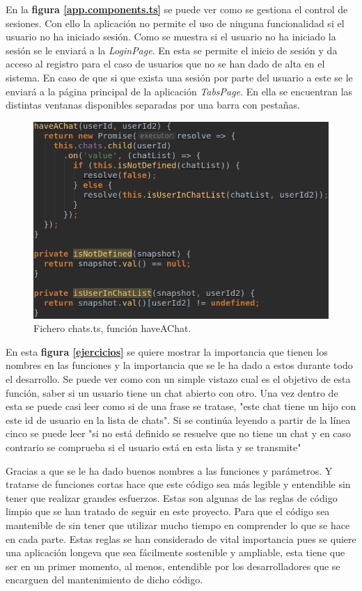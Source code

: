 \medskip
En la \textbf{figura \ref{app.components.ts}} se puede ver como se gestiona
el control de sesiones. Con ello la aplicación no permite el uso de ninguna
funcionalidad si el usuario no ha iniciado sesión. Como se muestra si el usuario
no ha iniciado la sesión se le enviará a la \textit{LoginPage}. En esta se
permite el inicio de sesión y da acceso al registro para el caso de usuarios
que no se han dado de alta en el sistema. En caso de que si que exista
una sesión por parte del usuario a este se le enviará a la página principal
de la aplicación \textit{TabsPage}. En ella se encuentran las distintas
ventanas disponibles separadas por una barra con pestañas.

\begin{figure}
    \includegraphics[width=\linewidth]{./images/code/chats-provider-haveAChar.png}
    \caption{Fichero chats.ts, función haveAChat.}
    \label{chats.ts.provider}
\end{figure}

\medskip
En esta \textbf{figura \ref{ejercicios}} se quiere mostrar la importancia que
tienen los nombres en las funciones y la importancia que se le ha dado a
estos durante todo el desarrollo. Se puede ver como con un simple vistazo
cual es el objetivo de esta función, saber si un usuario tiene un
chat abierto con otro. Una vez dentro de esta se puede casi leer como
si de una frase se tratase, "este chat tiene un hijo con este id de usuario
en la lista de chats". Si se continúa leyendo a partir de la línea cinco
se puede leer "si no está definido se resuelve que no tiene un chat y en
caso contrario se comprueba si el usuario está en esta lista y se transmite"

\medskip
Gracias a que se le ha dado buenos nombres a las funciones y parámetros.
Y tratarse de funciones cortas hace que este código sea más legible y entendible sin tener
que realizar grandes esfuerzos. Estas son algunas de las reglas de código limpio \cite{clean-code}
que se han tratado de seguir en este proyecto. Para que el código sea mantenible
de sin tener que utilizar mucho tiempo en comprender lo que se hace en cada parte.
Estas reglas se han considerado
de vital importancia pues se quiere una aplicación longeva que sea fácilmente
sostenible y ampliable, esta tiene que ser en un primer momento, al menos,
entendible por los desarrolladores que se encarguen del mantenimiento de dicho código.


